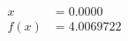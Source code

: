 \documentclass[preview]{standalone}
\begin{document}
\begin{align*}
x &= 0.0000\\f(x) &= 4.0069722
\end{align*}
\end{document}
